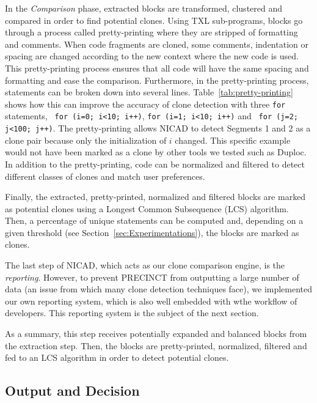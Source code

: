\documentclass[conference]{IEEEtran}
\begin{document}
In the \textit{Comparison} phase, extracted blocks are transformed, clustered and compared in order to find potential clones.
Using TXL sub-programs, blocks go through a process called pretty-printing where they are stripped of formatting and comments.
When code fragments are cloned, some comments, indentation or spacing are changed according to the new context where the new code is used. This pretty-printing process ensures that all code will have the same spacing and formatting and ease the comparison.
Furthermore, in the pretty-printing process, statements can be broken down into several lines.
Table~\ref{tab:pretty-printing} shows how this can improve the accuracy of clone detection with three \texttt{for} statements, \texttt{ for (i=0; i<10; i++)}, \texttt{for (i=1; i<10; i++)} and \texttt{ for (j=2; j<100; j++)}.
The pretty-printing allows NICAD to detect Segments 1 and 2 as a clone pair because only the initialization of $i$ changed.
This specific example would not have been marked as a clone by other  tools we tested such as Duploc\cite{Ducasse1999}.
In addition to the pretty-printing, code can be normalized and filtered to detect different classes of clones and match user preferences.



Finally, the extracted, pretty-printed, normalized and filtered blocks are marked as potential clones using a Longest Common Subsequence (LCS) algorithm\cite{Hunt1977}. Then, a percentage of unique statements can be computed and, depending on a given threshold (see Section~\ref{sec:Experimentations}), the blocks are marked as clones.

The last step of NICAD, which acts as our clone comparison engine, is the \textit{reporting}. However, to prevent PRECINCT from outputting  a large number of data (an issue from which many clone detection techniques face), we  implemented our own reporting system, which is also well embedded with wthe workflow of developers. This reporting system is the subject of the next section.

As a summary, this step receives potentially expanded and balanced blocks from the extraction step.
Then, the blocks are pretty-printed, normalized, filtered and fed to an LCS algorithm in order to detect potential clones.

\subsection{Output and Decision}
\label{sub:Output and Decision}
\end{document}
